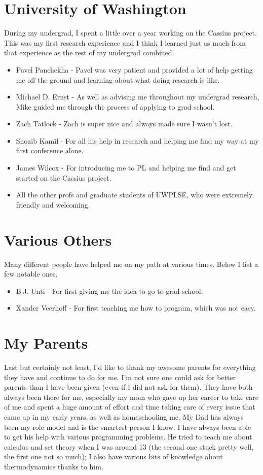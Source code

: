 \section*{University of Washington}
During my undergrad, I spent a little over a year working on the Cassius project.
This was my first research experience and I think I learned just as much from that experience as the rest of my undergrad combined.
\begin{itemize}
    \item Pavel Panchekha - Pavel was very patient and provided a lot of help getting me off the ground and learning about what doing research is like.
    \item Michael D. Ernst - As well as advising me throughout my undergrad research, Mike guided me through the process of applying to grad school.
    \item Zach Tatlock - Zach is super nice and always made sure I wasn't lost.
    \item Shoaib Kamil - For all his help in research and helping me find my way at my first conference alone.
    \item James Wilcox - For introducing me to PL and helping me find and get started on the Cassius project.
    \item All the other profs and graduate students of UWPLSE, who were extremely friendly and welcoming.
\end{itemize}

\section*{Various Others}
Many different people have helped me on my path at various times. Below I list a few notable ones.
\begin{itemize}
    \item B.J. Unti - For first giving me the idea to go to grad school.
    \item Xander Veerhoff - For first teaching me how to program, which was not easy.
\end{itemize}

\section*{My Parents}
Last but certainly not least, I'd like to thank my awesome parents for everything they have and continue to do for me.
I'm not sure one could ask for better parents than I have been given (even if I did not ask for them).
They have both always been there for me, especially my mom who gave up her career to take care of me and spent a huge amount of effort and time taking care of every issue that came up in my early years, as well as homeschooling me.
My Dad has always been my role model and is the smartest person I know.
I have always been able to get his help with various programming problems.
He tried to teach me about calculus and set theory when I was around 13 (the second one stuck pretty well, the first one not so much); I also have various bits of knowledge about thermodynamics thanks to him.
